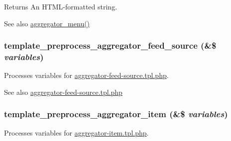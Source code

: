 \begin{DoxyReturn}{Returns}
An HTML-\/formatted string.
\end{DoxyReturn}
\begin{DoxySeeAlso}{See also}
\hyperlink{aggregator_8module_a18d55253ab5538426a4fc6d20b672dda}{aggregator\_\-menu()} 
\end{DoxySeeAlso}
\hypertarget{aggregator_8pages_8inc_a06bc89c22bcd3b3c70c9c1d19391aefc}{
\subsubsection[{template\_\-preprocess\_\-aggregator\_\-feed\_\-source}]{\setlength{\rightskip}{0pt plus 5cm}template\_\-preprocess\_\-aggregator\_\-feed\_\-source (\&\$ {\em variables})}}
\label{aggregator_8pages_8inc_a06bc89c22bcd3b3c70c9c1d19391aefc}
Processes variables for \hyperlink{aggregator-feed-source_8tpl_8php}{aggregator-\/feed-\/source.tpl.php}.

\begin{DoxySeeAlso}{See also}
\hyperlink{aggregator-feed-source_8tpl_8php}{aggregator-\/feed-\/source.tpl.php} 
\end{DoxySeeAlso}
\hypertarget{aggregator_8pages_8inc_a98e977c5fd28c4e808be5786a3f9e805}{
\subsubsection[{template\_\-preprocess\_\-aggregator\_\-item}]{\setlength{\rightskip}{0pt plus 5cm}template\_\-preprocess\_\-aggregator\_\-item (\&\$ {\em variables})}}
\label{aggregator_8pages_8inc_a98e977c5fd28c4e808be5786a3f9e805}
Processes variables for \hyperlink{aggregator-item_8tpl_8php}{aggregator-\/item.tpl.php}.

